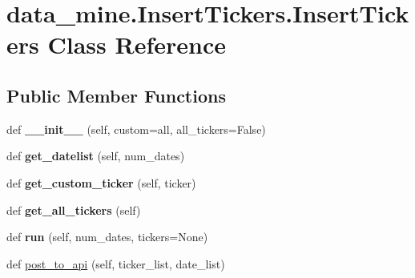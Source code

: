 \hypertarget{classdata__mine_1_1_insert_tickers_1_1_insert_tickers}{}\section{data\+\_\+mine.\+Insert\+Tickers.\+Insert\+Tickers Class Reference}
\label{classdata__mine_1_1_insert_tickers_1_1_insert_tickers}
\subsection*{Public Member Functions}
\begin{DoxyCompactItemize}
\item 
\mbox{\label{classdata__mine_1_1_insert_tickers_1_1_insert_tickers_a3b0d7675445fcbb17a31ab3214f471e0}} 
def {\bfseries \+\_\+\+\_\+init\+\_\+\+\_\+} (self, custom=\textquotesingle{}all\textquotesingle{}, all\+\_\+tickers=False)
\item 
\mbox{\label{classdata__mine_1_1_insert_tickers_1_1_insert_tickers_a6090e2f692effe8e712840453ebcd5ff}} 
def {\bfseries get\+\_\+datelist} (self, num\+\_\+dates)
\item 
\mbox{\label{classdata__mine_1_1_insert_tickers_1_1_insert_tickers_ab69431f5b0fbeffdddd33e57d908199a}} 
def {\bfseries get\+\_\+custom\+\_\+ticker} (self, ticker)
\item 
\mbox{\label{classdata__mine_1_1_insert_tickers_1_1_insert_tickers_a94721312a4859670da22037a475a8221}} 
def {\bfseries get\+\_\+all\+\_\+tickers} (self)
\item 
\mbox{\label{classdata__mine_1_1_insert_tickers_1_1_insert_tickers_ab9ab73c2a11c89792504f2b2e92b3f01}} 
def {\bfseries run} (self, num\+\_\+dates, tickers=None)
\item 
def \mbox{\hyperlink{classdata__mine_1_1_insert_tickers_1_1_insert_tickers_a817932df15b0d8af46ccb0f3b3f009be}{post\+\_\+to\+\_\+api}} (self, ticker\+\_\+list, date\+\_\+list)
\end{DoxyCompactItemize}
